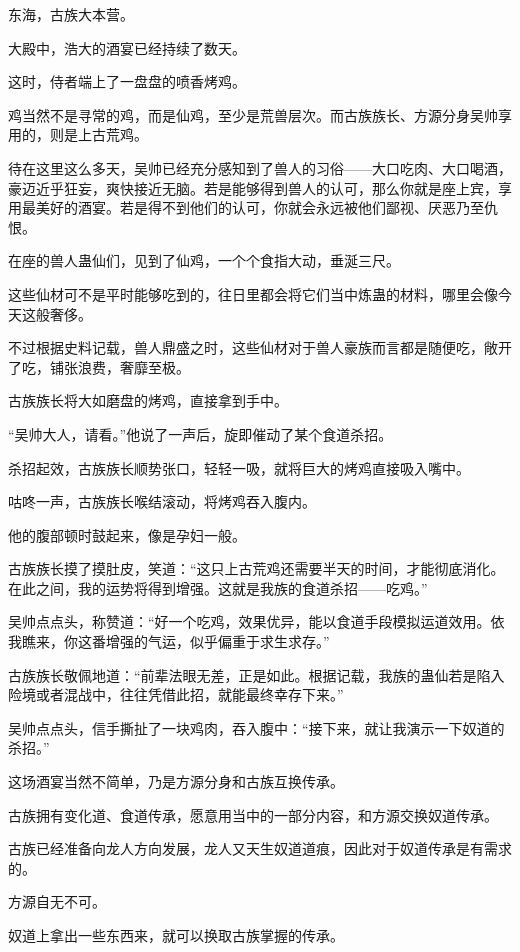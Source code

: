 
\begin{this_body}

东海，古族大本营。

大殿中，浩大的酒宴已经持续了数天。

这时，侍者端上了一盘盘的喷香烤鸡。

鸡当然不是寻常的鸡，而是仙鸡，至少是荒兽层次。而古族族长、方源分身吴帅享用的，则是上古荒鸡。

待在这里这么多天，吴帅已经充分感知到了兽人的习俗——大口吃肉、大口喝酒，豪迈近乎狂妄，爽快接近无脑。若是能够得到兽人的认可，那么你就是座上宾，享用最美好的酒宴。若是得不到他们的认可，你就会永远被他们鄙视、厌恶乃至仇恨。

在座的兽人蛊仙们，见到了仙鸡，一个个食指大动，垂涎三尺。

这些仙材可不是平时能够吃到的，往日里都会将它们当中炼蛊的材料，哪里会像今天这般奢侈。

不过根据史料记载，兽人鼎盛之时，这些仙材对于兽人豪族而言都是随便吃，敞开了吃，铺张浪费，奢靡至极。

古族族长将大如磨盘的烤鸡，直接拿到手中。

“吴帅大人，请看。”他说了一声后，旋即催动了某个食道杀招。

杀招起效，古族族长顺势张口，轻轻一吸，就将巨大的烤鸡直接吸入嘴中。

咕咚一声，古族族长喉结滚动，将烤鸡吞入腹内。

他的腹部顿时鼓起来，像是孕妇一般。

古族族长摸了摸肚皮，笑道：“这只上古荒鸡还需要半天的时间，才能彻底消化。在此之间，我的运势将得到增强。这就是我族的食道杀招——吃鸡。”

吴帅点点头，称赞道：“好一个吃鸡，效果优异，能以食道手段模拟运道效用。依我瞧来，你这番增强的气运，似乎偏重于求生求存。”

古族族长敬佩地道：“前辈法眼无差，正是如此。根据记载，我族的蛊仙若是陷入险境或者混战中，往往凭借此招，就能最终幸存下来。”

吴帅点点头，信手撕扯了一块鸡肉，吞入腹中：“接下来，就让我演示一下奴道的杀招。”

这场酒宴当然不简单，乃是方源分身和古族互换传承。

古族拥有变化道、食道传承，愿意用当中的一部分内容，和方源交换奴道传承。

古族已经准备向龙人方向发展，龙人又天生奴道道痕，因此对于奴道传承是有需求的。

方源自无不可。

奴道上拿出一些东西来，就可以换取古族掌握的传承。


\end{this_body}
